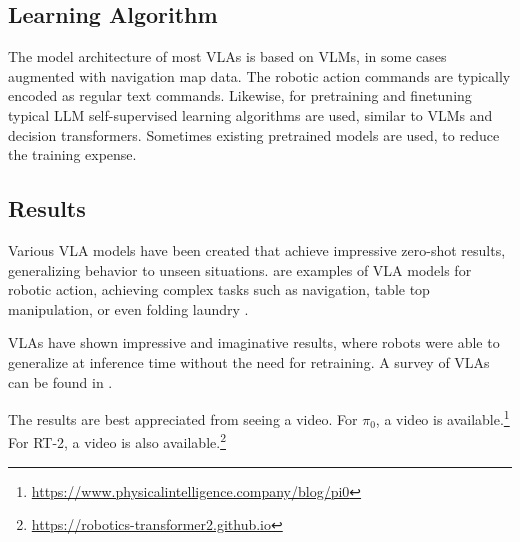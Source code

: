 \subsection{Learning Algorithm}
The model architecture of most VLAs is based on VLMs, in some cases augmented with navigation map data. The  robotic action commands are typically encoded as regular text commands. Likewise, for pretraining and finetuning typical LLM self-supervised learning algorithms are used, similar to VLMs and decision transformers. Sometimes existing pretrained models are used, to reduce the training expense.


\subsection{Results}
Various VLA models have been
created that achieve impressive zero-shot results, generalizing behavior to unseen situations. 
\citet{chiang2024mobility,brohan2023rt,yang2025magma} are examples of
VLA models for robotic action, achieving complex tasks such as navigation, table top manipulation, or even folding laundry \citep{black2024pi_0}. 


VLAs have shown impressive and imaginative results, where robots were able to generalize at inference time without the need for retraining. A survey of VLAs can be found in
\citep{ma2024survey}.

The results are best appreciated from seeing a video.
For $\pi_0$, a video is  available.\footnote{\url{https://www.physicalintelligence.company/blog/pi0}} 
For RT-2,  a video is also  available.\footnote{\url{https://robotics-transformer2.github.io}} 





